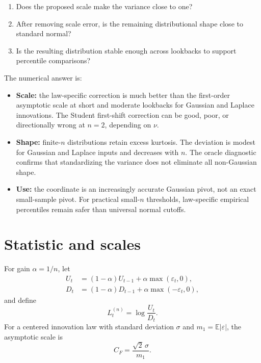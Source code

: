 \documentclass[10pt]{article}
\newcommand{\E}{\mathbb{E}}
\begin{document}
\begin{enumerate}
\item Does the proposed scale make the variance close to one?
\item After removing scale error, is the remaining distributional shape close
      to standard normal?
\item Is the resulting distribution stable enough across lookbacks to support
      percentile comparisons?
\end{enumerate}

The numerical answer is:

\begin{itemize}
\item \textbf{Scale:} the law-specific correction is much better than the
      first-order asymptotic scale at short and moderate lookbacks for Gaussian
      and Laplace innovations.  The Student first-shift correction can be good,
      poor, or directionally wrong at \(n=2\), depending on \(\nu\).
\item \textbf{Shape:} finite-\(n\) distributions retain excess kurtosis.  The
      deviation is modest for Gaussian and Laplace inputs and decreases with
      \(n\).  The oracle diagnostic confirms that standardizing the variance
      does not eliminate all non-Gaussian shape.
\item \textbf{Use:} the coordinate is an increasingly accurate Gaussian pivot,
      not an exact small-sample pivot.  For practical small-\(n\) thresholds,
      law-specific empirical percentiles remain safer than universal normal
      cutoffs.
\end{itemize}

\section{Statistic and scales}

For gain \(\alpha=1/n\), let
\begin{align}
U_t&=(1-\alpha)U_{t-1}+\alpha\max(\varepsilon_t,0),\\
D_t&=(1-\alpha)D_{t-1}+\alpha\max(-\varepsilon_t,0),
\end{align}
and define
\begin{equation}
L_t^{(n)}=\log\frac{U_t}{D_t}.
\end{equation}
For a centered innovation law with standard deviation \(\sigma\) and
\(m_1=\E|\varepsilon|\), the asymptotic scale is
\begin{equation}
C_F=\frac{\sqrt{2}\,\sigma}{m_1}.
\end{equation}
\end{document}
